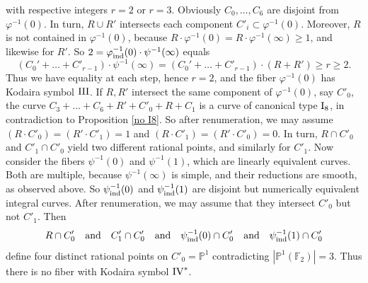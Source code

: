 \documentclass[oneside, 12pt]{amsart}
\theoremstyle{definition}
\theoremstyle{remark}
\newcommand{\FF}{\mathbb{F}}
\newcommand{\PP}{\mathbb{P}}
\newcommand{\I}{\text{\rm I}}
\newcommand{\III}{\text{\rm III}}
\newcommand{\IV}{\text{\rm IV}}
\newcommand{\quadand}{\quad\text{and}\quad}
\newcommand{\ra}{\rightarrow}
\newcommand{\ind}{\text{\rm ind}}
\newcommand{\inv}{{-1}}
\begin{document}
with respective integers $r=2$ or $r=3$.
Obviously  $C_0,\ldots,C_6$ are disjoint from  $\varphi^{-1}(0)$.
In turn, $R\cup R'$ intersects each component $C'_i\subset\varphi^\inv(0)$.
Moreover, $R$ is not contained in $\varphi^{-1}(0)$, because 
$R\cdot\varphi^{-1}(0) = R\cdot \varphi^{-1}(\infty)\geq 1$, and likewise for $R'$.
So $2=\varphi^{-1}_\ind(0) \cdot \psi^{-1}(\infty) $ equals
$$
(C_0'+\ldots+C'_{r-1})\cdot \psi^{-1}(\infty) = (C_0'+\ldots+C'_{r-1})\cdot(R+R') \geq r\geq 2.
$$
Thus we have equality at each step, hence $r=2$, and the fiber $\varphi^{-1}(0)$ has Kodaira symbol $\III$.
If $R,R'$ intersect the same component of $\varphi^{-1}(0)$, say $C'_0$, the curve $C_3+\ldots+C_6+R'+C'_0+R+ C_1$ is
a curve of canonical type $\I_8$, in contradiction to Proposition \ref{no I8}.
So after renumeration, we may assume $(R\cdot C'_0)=(R'\cdot C'_1)=1$ and $(R\cdot C'_1)=(R'\cdot C'_0)=0$.
In turn, $R\cap C'_0$ and $C'_1\cap C'_0$ yield two different rational points, and similarly for $C'_1$.
Now consider the   fibers $\psi^{-1}(0)$ and $\psi^{-1}(1)$, which are linearly equivalent curves.
Both are multiple, because $\psi^{-1}(\infty)$ is simple, and their reductions are smooth, as   observed above.
So $\psi^{-1}_\ind(0)$ and $\psi^{-1}_\ind(1)$ are disjoint but numerically equivalent integral curves.
After renumeration, we may assume that they intersect $C'_0$ but not $C'_1$. Then 
$$
R\cap C'_0\quadand C'_1\cap C'_0\quadand \psi^{-1}_\ind(0)\cap C'_0 \quadand \psi^{-1}_\ind(1)\cap C'_0
$$
define four distinct rational points on $C'_0=\PP^1$
contradicting $|\PP^1(\FF_2)|=3$.  Thus there is no fiber with Kodaira symbol $\IV^*$.
\end{document}
